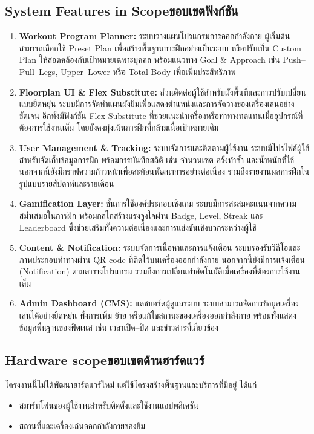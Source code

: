 \subsection{\ifenglish System Features in Scope\else ขอบเขตฟังก์ชัน\fi}
\begin{enumerate}
    \item \textbf{Workout Program Planner:} ระบบวางแผนโปรแกรมการออกกำลังกาย
    ผู้เริ่มต้นสามารถเลือกใช้ Preset Plan เพื่อสร้างพื้นฐานการฝึกอย่างเป็นระบบ หรือปรับเป็น Custom Plan ให้สอดคล้องกับเป้าหมายเฉพาะบุคคล พร้อมแนวทาง Goal \& Approach เช่น Push--Pull--Legs, Upper--Lower หรือ Total Body เพื่อเพิ่มประสิทธิภาพ

    \item \textbf{Floorplan UI \& Flex Substitute:} ส่วนติดต่อผู้ใช้สำหรับผังพื้นที่และการปรับเปลี่ยนแบบยืดหยุ่น
    ระบบมีการจัดทำแผนผังยิมเพื่อแสดงตำแหน่งและการจัดวางของเครื่องเล่นอย่างชัดเจน อีกทั้งมีฟังก์ชัน Flex Substitute ที่ช่วยแนะนำเครื่องหรือท่าทางทดแทนเมื่ออุปกรณ์ที่ต้องการใช้งานเต็ม โดยยังคงมุ่งเน้นการฝึกที่กล้ามเนื้อเป้าหมายเดิม

    \item \textbf{User Management \& Tracking:} ระบบจัดการและติดตามผู้ใช้งาน
    ระบบมีโปรไฟล์ผู้ใช้สำหรับจัดเก็บข้อมูลการฝึก พร้อมการบันทึกสถิติ เช่น จำนวนเซต ครั้งทำซ้ำ และน้ำหนักที่ใช้ นอกจากนี้ยังมีกราฟความก้าวหน้าเพื่อสะท้อนพัฒนาการอย่างต่อเนื่อง รวมถึงรายงานผลการฝึกในรูปแบบรายสัปดาห์และรายเดือน

    \item \textbf{Gamification Layer:} ชั้นการใช้องค์ประกอบเชิงเกม
    ระบบมีการสะสมคะแนนจากความสม่ำเสมอในการฝึก พร้อมกลไกสร้างแรงจูงใจผ่าน Badge, Level, Streak และ Leaderboard ซึ่งช่วยเสริมทั้งความต่อเนื่องและการแข่งขันเชิงบวกระหว่างผู้ใช้

    \item \textbf{Content \& Notification:} ระบบจัดการเนื้อหาและการแจ้งเตือน
    ระบบรองรับวิดีโอและภาพประกอบท่าทางผ่าน QR code ที่ติดไว้บนเครื่องออกกำลังกาย นอกจากนี้ยังมีการแจ้งเตือน (Notification) ตามตารางโปรแกรม รวมถึงการเปลี่ยนท่าอัตโนมัติเมื่อเครื่องที่ต้องการใช้งานเต็ม

    \item \textbf{Admin Dashboard (CMS):} แดชบอร์ดผู้ดูแลระบบ
    ระบบสามารถจัดการข้อมูลเครื่องเล่นได้อย่างยืดหยุ่น ทั้งการเพิ่ม ย้าย หรือแก้ไขสถานะของเครื่องออกกำลังกาย พร้อมทั้งแสดงข้อมูลพื้นฐานของฟิตเนส เช่น เวลาเปิด--ปิด และข่าวสารที่เกี่ยวข้อง
\end{enumerate}

\subsection{\ifenglish Hardware scope\else ขอบเขตด้านฮาร์ดแวร์\fi}
\enskip โครงงานนี้ไม่ได้พัฒนาฮาร์ดแวร์ใหม่ แต่ใช้โครงสร้างพื้นฐานและบริการที่มีอยู่ ได้แก่
\begin{itemize}
    \item สมาร์ทโฟนของผู้ใช้งานสำหรับติดตั้งและใช้งานแอปพลิเคชัน
    \item สถานที่และเครื่องเล่นออกกำลังกายของยิม
\end{itemize}

